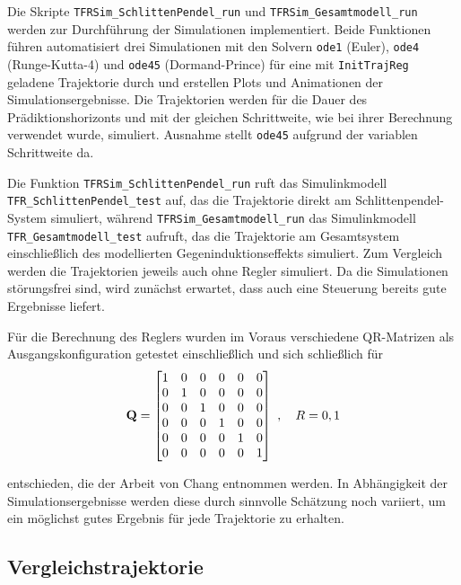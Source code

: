 Die Skripte \texttt{TFRSim\_SchlittenPendel\_run} und \texttt{TFRSim\_Gesamtmodell\_run} werden zur Durchführung der Simulationen implementiert. Beide Funktionen führen automatisiert drei Simulationen mit den Solvern \texttt{ode1} (Euler), \texttt{ode4} (Runge-Kutta-4) und \texttt{ode45} (Dormand-Prince) für eine mit \texttt{InitTrajReg} geladene Trajektorie durch und erstellen Plots und Animationen der Simulationsergebnisse. Die Trajektorien werden für die Dauer des Prädiktionshorizonts und mit der gleichen Schrittweite, wie bei ihrer Berechnung verwendet wurde, simuliert. Ausnahme stellt \texttt{ode45} aufgrund der variablen Schrittweite da.

Die Funktion \texttt{TFRSim\_SchlittenPendel\_run} ruft das Simulinkmodell \texttt{TFR\_SchlittenPendel\_test} auf, das die Trajektorie direkt am Schlittenpendel-System simuliert, während \texttt{TFRSim\_Gesamtmodell\_run} das Simulinkmodell \texttt{TFR\_Gesamtmodell\_test} aufruft, das die Trajektorie am Gesamtsystem einschließlich des modellierten Gegeninduktionseffekts simuliert. Zum Vergleich werden die Trajektorien jeweils auch ohne Regler simuliert. Da die Simulationen störungsfrei sind, wird zunächst erwartet, dass auch eine Steuerung bereits gute Ergebnisse liefert.

Für die Berechnung des Reglers wurden im Voraus verschiedene QR-Matrizen als Ausgangskonfiguration getestet einschließlich und sich schließlich für 
\[ 
	{\boldsymbol{\mathrm{Q}}} = 
	\begin{bmatrix}
		1 & 0 & 0 & 0 & 0 & 0 \\
		0 & 1 & 0 & 0 & 0 & 0 \\
		0 & 0 & 1 & 0 & 0 & 0 \\
		0 & 0 & 0 & 1 & 0 & 0 \\
		0 & 0 & 0 & 0 & 1 & 0 \\
		0 & 0 & 0 & 0 & 0 & 1 \\
	\end{bmatrix} \ , \quad
	R = 0,1 \\
\]

entschieden, die der Arbeit von Chang \cite{chang} entnommen werden. In Abhängigkeit der Simulationsergebnisse werden diese durch sinnvolle Schätzung noch variiert, um ein möglichst gutes Ergebnis für jede Trajektorie zu erhalten.    

\subsection{Vergleichstrajektorie}\label{subsec:vglTrj}


